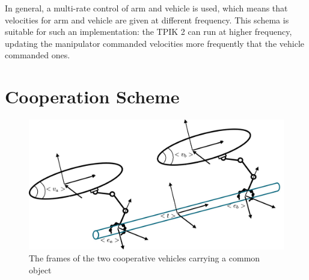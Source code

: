 In general, a multi-rate control of arm and vehicle is used, which means that velocities for arm and vehicle are given at different frequency. This schema is suitable for such an implementation: the TPIK 2 can run at higher frequency, updating the manipulator commanded velocities more frequently that the vehicle commanded ones.

\section{Cooperation Scheme}
\label{sec:coopScheme}
\begin{figure}[H]
	\begin{center}
		\includegraphics[width=0.60\columnwidth]{coopFrames.jpg}
		\caption{The frames of the two cooperative vehicles carrying a common object}\label{fig:coopFrames}
	\end{center}
\end{figure}


